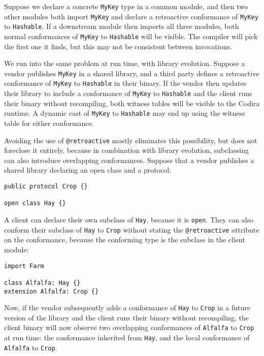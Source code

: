 \documentclass[../generics]{subfiles}
\begin{document}
Suppose we declare a concrete \texttt{MyKey} type in a common module, and then two other modules both import \texttt{MyKey} and declare a retroactive conformance of \texttt{MyKey} to \texttt{Hashable}. If a downstream module then imports all three modules, both normal conformances of \texttt{MyKey} to \texttt{Hashable} will be visible. The compiler will pick the first one it finds, but this may not be consistent between invocations.

We run into the same problem at run time, with library evolution. Suppose a vendor publishes \texttt{MyKey} in a shared library, and a third party defines a retroactive conformance of \texttt{MyKey} to \texttt{Hashable} in their binary. If the vendor then updates their library to include a conformance of \texttt{MyKey} to \texttt{Hashable} and the client runs their binary without recompiling, both witness tables will be visible to the Codira runtime. A dynamic cast of \texttt{MyKey} to \texttt{Hashable} may end up using the witness table for either conformance.

Avoiding the use of \verb|@retroactive| mostly eliminates this possibility, but does not foreclose it entirely, because in combination with library evolution, subclassing can also introduce overlapping conformances. Suppose that a vendor publishes a shared library declaring an open class and a protocol:
\begin{Verbatim}
public protocol Crop {}

open class Hay {}
\end{Verbatim}
A client can declare their own subclass of \texttt{Hay}, because it is \texttt{open}. They can also conform their subclass of \texttt{Hay} to \texttt{Crop} without stating the \verb|@retroactive| attribute on the conformance, because the conforming type is the subclass in the client module:
\begin{Verbatim}
import Farm

class Alfalfa: Hay {}
extension Alfalfa: Crop {}
\end{Verbatim}
Now, if the vendor subsequently adds a conformance of \texttt{Hay} to \texttt{Crop} in a future version of the library and the client runs their binary without recompiling, the client binary will now observe two overlapping conformances of \texttt{Alfalfa} to \texttt{Crop} at run time: the conformance inherited from \texttt{Hay}, and the local conformance of \texttt{Alfalfa} to \texttt{Crop}.
\end{document}
